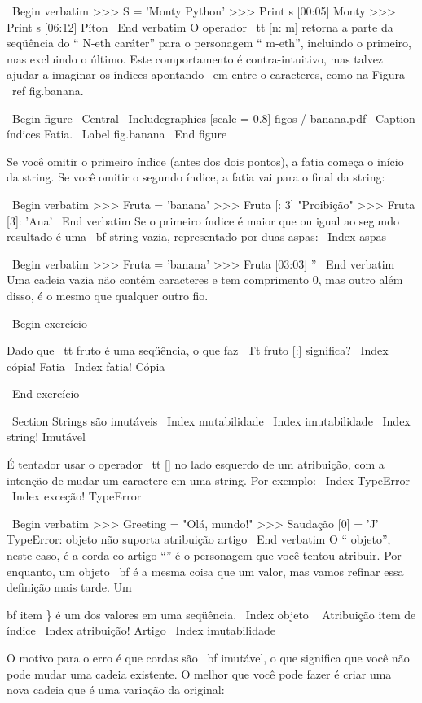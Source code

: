 \documentclass[10pt]{book}
\begin{document}
\begin {itemize}
{{{{\ Begin {verbatim}
>>> S = 'Monty Python'
>>> Print s [00:05]
Monty
>>> Print s [06:12]
Píton
\ End {verbatim}
%
O operador {\ tt [n: m]} retorna a parte da seqüência do 
`` N-eth caráter'' para o personagem `` m-eth'', incluindo o primeiro, mas
excluindo o último. Este comportamento é contra-intuitivo, mas talvez
ajudar a imaginar os índices apontando {\ em} entre o
caracteres, como na Figura ~ \ ref {} fig.banana.

\ Begin {figure}
\ Central
{\ Includegraphics [scale = 0.8] {figos / banana.pdf}}
\ Caption {índices Fatia.}
\ Label {} fig.banana
\ End {figure}


Se você omitir o primeiro índice (antes dos dois pontos), a fatia começa
o início da string. Se você omitir o segundo índice, a fatia
vai para o final da string:

\ Begin {verbatim}
>>> Fruta = 'banana'
>>> Fruta [: 3]
"Proibição"
>>> Fruta [3]:
'Ana'
\ End {verbatim}
%
Se o primeiro índice é maior que ou igual ao segundo resultado
é uma {\ bf string vazia}, representado por duas aspas:
\ Index {aspas}

\ Begin {verbatim}
>>> Fruta = 'banana'
>>> Fruta [03:03]
''
\ End {verbatim}
%
Uma cadeia vazia não contém caracteres e tem comprimento 0, mas outro
além disso, é o mesmo que qualquer outro fio.

\ Begin {} exercício

Dado que {\ tt fruto} é uma seqüência, o que faz
{\ Tt fruto [:]} significa?
\ Index {cópia! Fatia}
\ Index {fatia! Cópia}

\ End {} exercício


\ Section {Strings são imutáveis}
\ Index {} mutabilidade
\ Index {imutabilidade}
\ Index {string! Imutável}

É tentador usar o operador {\ tt []} no lado esquerdo de um
atribuição, com a intenção de mudar um caractere em uma string.
Por exemplo:
\ Index {} TypeError
\ Index {exceção! TypeError}

\ Begin {verbatim}
>>> Greeting = "Olá, mundo!"
>>> Saudação [0] = 'J'
TypeError: objeto não suporta atribuição artigo
\ End {verbatim}
%
O `` objeto'', neste caso, é a corda eo artigo ``'' é
o personagem que você tentou atribuir. Por enquanto, um objeto {\ bf} é
a mesma coisa que um valor, mas vamos refinar essa definição
mais tarde. Um {bf item \} é um dos valores em uma seqüência.
\ Index {objeto}
\ {} Atribuição item de índice
\ Index {atribuição! Artigo}
\ Index {imutabilidade}

O motivo para o erro é que
cordas são {\ bf} imutável, o que significa que você não pode mudar uma
cadeia existente. O melhor que você pode fazer é criar uma nova cadeia
que é uma variação da original:

}}}}}
\end{itemize}
\end{document}
